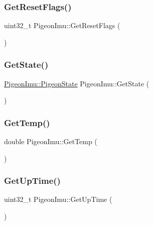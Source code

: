 \mbox{\label{class_pigeon_imu_aac22214226d6cd5b286136fa080f8dfa}} 
\subsubsection{\texorpdfstring{Get\+Reset\+Flags()}{GetResetFlags()}}
{\footnotesize\ttfamily uint32\+\_\+t Pigeon\+Imu\+::\+Get\+Reset\+Flags (\begin{DoxyParamCaption}{ }\end{DoxyParamCaption})}

\mbox{\label{class_pigeon_imu_aba2f25e640cd9bd4fcf543c3ab3a5781}} 
\subsubsection{\texorpdfstring{Get\+State()}{GetState()}}
{\footnotesize\ttfamily \hyperlink{class_pigeon_imu_af08e19459beb068e840719205fa46c39}{Pigeon\+Imu\+::\+Pigeon\+State} Pigeon\+Imu\+::\+Get\+State (\begin{DoxyParamCaption}{ }\end{DoxyParamCaption})}

\mbox{\label{class_pigeon_imu_a3645bd88a064fec619e01b90e0f525d7}} 
\subsubsection{\texorpdfstring{Get\+Temp()}{GetTemp()}}
{\footnotesize\ttfamily double Pigeon\+Imu\+::\+Get\+Temp (\begin{DoxyParamCaption}{ }\end{DoxyParamCaption})}

\mbox{\label{class_pigeon_imu_a97595383793dcf68a68ed22c17a39301}} 
\subsubsection{\texorpdfstring{Get\+Up\+Time()}{GetUpTime()}}
{\footnotesize\ttfamily uint32\+\_\+t Pigeon\+Imu\+::\+Get\+Up\+Time (\begin{DoxyParamCaption}{ }\end{DoxyParamCaption})}



